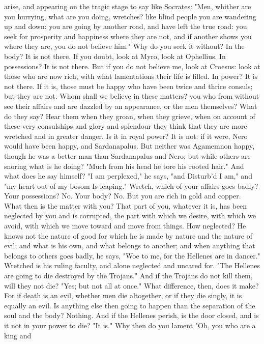 \documentclass[a4paper]{article}
\begin{document}
arise, and appearing on the tragic stage to say like Socrates: "Men, whither
are you hurrying, what are you doing, wretches? like blind people you are
wandering up and down: you are going by another road, and have left the true
road: you seek for prosperity and happiness where they are not, and if another
shows you where they are, you do not believe him." Why do you seek it without?
In the body? It is not there. If you doubt, look at Myro, look at Ophellius. In
possessions? It is not there. But if you do not believe me, look at Croesus:
look at those who are now rich, with what lamentations their life is filled. In
power? It is not there. If it is, those must be happy who have been twice and
thrice consuls; but they are not. Whom shall we believe in these matters? you
who from without see their affairs and are dazzled by an appearance, or the men
themselves? What do they say? Hear them when they groan, when they grieve, when
on account of these very consulships and glory and splendour they think that
they are more wretched and in greater danger. Is it in royal power? It is not:
if it were, Nero would have been happy, and Sardanapalus. But neither was
Agamemnon happy, though he was a better man than Sardanapalus and Nero; but
while others are snoring what is he doing?
       "Much from his head he tore his rooted hair."
And what does he say himself?
       "I am perplexed," he says, "and
       Disturb'd I am," and "my heart out of my bosom
       Is leaping."
    Wretch, which of your affairs goes badly? Your possessions? No. Your body?
No. But you are rich in gold and copper. What then is the matter with you? That
part of you, whatever it is, has been neglected by you and is corrupted, the
part with which we desire, with which we avoid, with which we move toward and
move from things. How neglected? He knows not the nature of good for which he
is made by nature and the nature of evil; and what is his own, and what belongs
to another; and when anything that belongs to others goes badly, he says, "Woe
to me, for the Hellenes are in dancer." Wretched is his ruling faculty, and
alone neglected and uncared for. "The Hellenes are going to die destroyed by
the Trojans." And if the Trojans do not kill them, will they not die? "Yes; but
not all at once." What difference, then, does it make? For if death is an evil,
whether men die altogether, or if they die singly, it is equally an evil. Is
anything else then going to happen than the separation of the soul and the
body? Nothing. And if the Hellenes perish, is the door closed, and is it not in
your power to die? "It is." Why then do you lament "Oh, you who are a king and
\end{document}
